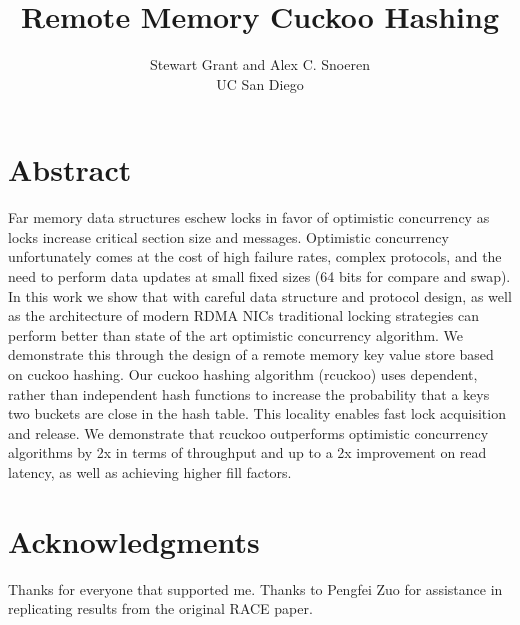 \documentclass[10pt,twocolumn]{article}
\begin{document}
\title{Remote Memory Cuckoo Hashing}
\author{Stewart Grant and Alex C. Snoeren\\ UC San Diego}
\date{}

\maketitle

\section*{Abstract}

Far memory data structures eschew locks in favor of
optimistic concurrency as locks increase critical section
size and messages. Optimistic concurrency unfortunately
comes at the cost of high failure rates, complex protocols,
and the need to perform data updates at small fixed sizes
(64 bits for compare and swap). In this work we show that
with careful data structure and protocol design, as well as
the architecture of modern RDMA NICs traditional locking
strategies can perform better than state of the art
optimistic concurrency algorithm. We demonstrate this
through the design of a remote memory key value store based
on cuckoo hashing. Our cuckoo hashing algorithm (rcuckoo)
uses dependent, rather than independent hash functions to
increase the probability that a keys two buckets are close
in the hash table. This locality enables fast lock
acquisition and release. We demonstrate that rcuckoo
outperforms optimistic concurrency algorithms by 2x in
terms of throughput and up to a 2x improvement on read
latency, as well as achieving higher fill factors.










\section*{Acknowledgments}

Thanks for everyone that supported me. Thanks to Pengfei Zuo
for assistance in replicating results from the original RACE
paper.


\balance
\vspace{-0.3cm}
{\footnotesize 
}
\vspace{-0.5cm}
\end{document}
